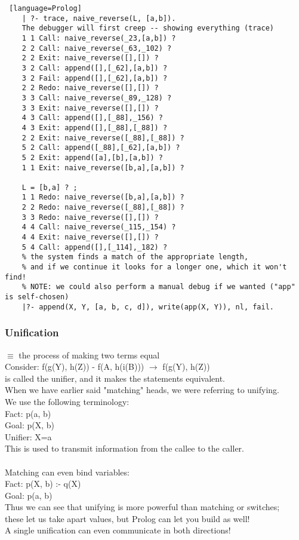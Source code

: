 \documentclass[../../lecture_notes.tex]{subfiles}
\begin{document}
\begin{lstlisting} [language=Prolog]
 	| ?- trace, naive_reverse(L, [a,b]).
 	The debugger will first creep -- showing everything (trace)
 	1 1 Call: naive_reverse(_23,[a,b]) ?
 	2 2 Call: naive_reverse(_63,_102) ?
 	2 2 Exit: naive_reverse([],[]) ?
 	3 2 Call: append([],[_62],[a,b]) ?
 	3 2 Fail: append([],[_62],[a,b]) ?
 	2 2 Redo: naive_reverse([],[]) ?
 	3 3 Call: naive_reverse(_89,_128) ?
 	3 3 Exit: naive_reverse([],[]) ?
 	4 3 Call: append([],[_88],_156) ?
 	4 3 Exit: append([],[_88],[_88]) ?
 	2 2 Exit: naive_reverse([_88],[_88]) ?
 	5 2 Call: append([_88],[_62],[a,b]) ?
 	5 2 Exit: append([a],[b],[a,b]) ?
 	1 1 Exit: naive_reverse([b,a],[a,b]) ?
 
 	L = [b,a] ? ;
 	1 1 Redo: naive_reverse([b,a],[a,b]) ?
 	2 2 Redo: naive_reverse([_88],[_88]) ?
 	3 3 Redo: naive_reverse([],[]) ?
 	4 4 Call: naive_reverse(_115,_154) ?
 	4 4 Exit: naive_reverse([],[]) ?
 	5 4 Call: append([],[_114],_182) ?
 	% the system finds a match of the appropriate length, 
 	% and if we continue it looks for a longer one, which it won't find!
 	% NOTE: we could also perform a manual debug if we wanted ("app" is self-chosen)
 	|?- append(X, Y, [a, b, c, d]), write(app(X, Y)), nl, fail.
\end{lstlisting}

\subsubsection*{Unification}
$\equiv$ the process of making two terms equal\\
Consider: f(g(Y), h(Z)) - f(A, h(i(B))) $\rightarrow$ f(g(Y), h(Z))\\
	 is called the unifier, and it makes the statements equivalent.\\
When we have earlier said "matching" heads, we were referring to unifying.\\
We use the following terminology:\\
	\indent Fact: p(a, b)\\
	\indent Goal: p(X, b)\\
	\indent Unifier: {X=a}\\
This is used to transmit information from the callee to the caller.\\
\\
Matching can even bind variables:\\
	\indent Fact: p(X, b) :- q(X)\\
	\indent Goal: p(a, b)\\
Thus we can see that unifying is more powerful than matching or switches;\\
	\indent these let us take apart values, but Prolog can let you build as well!
\\
A single unification can even communicate in both directions!\\
\end{document}
